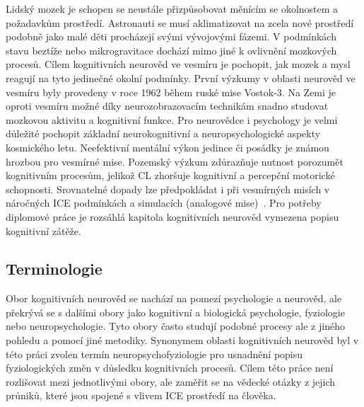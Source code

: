 Lidský mozek je schopen se neustále přizpůsobovat měnícím se okolnostem a
požadavkům prostředí. Astronauti se musí aklimatizovat na zcela nové prostředí
podobně jako malé děti procházejí svými vývojovými fázemi. V podmínkách stavu
beztíže nebo mikrogravitace dochází mimo jiné k ovlivnění mozkových procesů.
Cílem kognitivních neurověd ve vesmíru je pochopit, jak mozek a mysl reagují na
tyto jedinečné okolní podmínky. První výzkumy v oblasti neurověd ve vesmíru byly
provedeny v roce 1962 během ruské mise Vostok-3. Na Zemi je oproti vesmíru možné
díky neurozobrazovacím technikám snadno studovat mozkovou aktivitu a kognitivní
funkce. Pro neurovědce i psychology je velmi důležité pochopit základní
neurokognitivní a neuropsychologické aspekty kosmického letu. Neefektivní
mentální výkon jedince či posádky je známou hrozbou pro vesmírné mise. Pozemský
výzkum zdůrazňuje nutnost porozumět kognitivním procesům, jelikož \gls{CL}
zhoršuje kognitivní a percepční motorické schopnosti. Srovnatelné dopady lze
předpokládat i při vesmírných misích v náročných \gls{ICE} podmínkách a
simulacích (analogové mise)~\cite{Torre2014}. Pro potřeby diplomové práce je
rozsáhlá kapitola kognitivních neurověd vymezena popisu kognitivní zátěže.

\subsection{Terminologie}
\label{subsection:terminologie_CL}
Obor kognitivních neurověd se nachází na pomezí psychologie a neurověd, ale
překrývá se s dalšími obory jako kognitivní a biologická psychologie, fyziologie
nebo neuropsychologie. Tyto obory často studují podobné procesy ale z jiného
pohledu a pomocí jiné metodiky. Synonymem oblasti kognitivních neurověd byl v
této práci zvolen termín neuropsychofyziologie pro usnadnění popisu
fyziologických změn v důsledku kognitivních procesů. Cílem této práce není
rozlišovat mezi jednotlivými obory, ale zaměřit se na vědecké otázky z jejich
průniků, které jsou spojené s vlivem \gls{ICE} prostředí na člověka.

